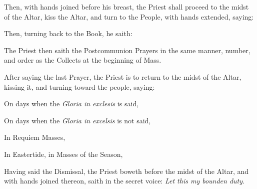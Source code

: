 
\begin{rubric}
    Then, with hands joined before his breast, the Priest shall proceed to the midst of the Altar, kiss the Altar, and turn to the People, with hands extended, saying:
\end{rubric}
\begin{rubric}
    Then, turning back to the Book, he saith:
\end{rubric}
\begin{rubric}
The Priest then saith the Postcommunion Prayers in the same manner, number, and order as the Collects at the beginning of Mass.
\end{rubric}
\begin{rubric}
    After saying the last Prayer, the Priest is to return to the midst of the Altar, kissing it, and turning toward the people, saying:
\end{rubric}
    \begin{rubric}
    	{On days when the \emph{Gloria in exclesis} is said,}
    \end{rubric}
    \begin{rubric}
    	{On days when the \emph{Gloria in excelsis} is not said,}
    \end{rubric}
\begin{rubric}
In Requiem Masses,
\end{rubric}
\begin{rubric}
    In Eastertide, in Masses of the Season,
\end{rubric}
\begin{rubric}
    Having said the Dismissal, the Priest boweth before the midst of the Altar, and with hands joined thereon, saith in the secret voice: \emph{Let this my bounden duty}.
\end{rubric}
